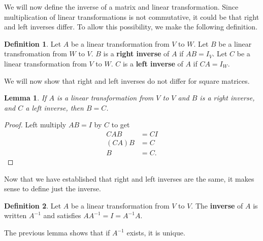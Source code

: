 \documentclass[12pt,reqno]{amsart}
\newtheorem{lemma}{Lemma}[section]
\theoremstyle{definition}
\newtheorem{definition}{Definition}[section]
\begin{document}
We will now define the inverse of a matrix and linear
transformation. Since multiplication of linear transformations is not
commutative, it could be that right and left inverses differ. To allow
this possibility, we make the following definition. 
\begin{definition}
  Let $A$ be a linear transformation from $V$ to $W$. Let $B$ be a
  linear transfromation from $W$ to $V$. $B$ is a \textbf{right
    inverse} of $A$ if $AB = I_V$. Let $C$ be a linear transformation
  from $V$ to $W$. $C$ is a \textbf{left inverse} of $A$ if $CA = I_W$. 
\end{definition}  
We will now show that right and left inverses do not differ for square
matrices. 
\begin{lemma}
  If $A$ is a linear transformation from $V$ to $V$ and $B$ is a right
  inverse, and $C$ a left inverse, then $B = C$. 
\end{lemma}
\begin{proof}
  Left multiply $AB = I$ by $C$ to get
  \begin{align*}
    CAB & = CI \\
    (CA) B & = C \\
    B & = C.
  \end{align*}
\end{proof}
Now that we have established that right and left inverses are the
same, it makes sense to define just the inverse.
\begin{definition} 
  Let $A$ be a linear transformation from $V$ to $V$. The
  \textbf{inverse} of $A$ is written $A^{-1}$ and satisfies $A A^{-1}
  = I = A^{-1} A$.
\end{definition}
The previous lemma shows that if $A^{-1}$ exists, it is unique. 
\end{document}

